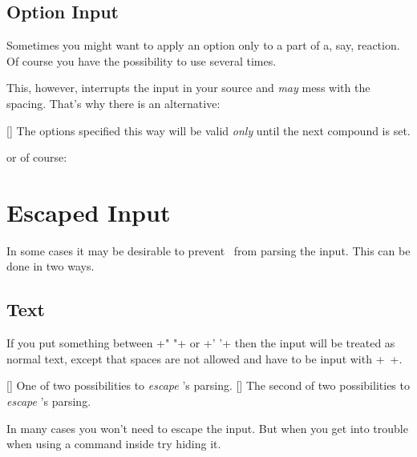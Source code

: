 \documentclass[load-preamble+]{cnltx-doc}
\begin{document}
\subsection{Option Input}
Sometimes you might want to apply an option only to a part of a, say,
reaction.  Of course you have the possibility to use  several times.
\begin{example}
  \textcolor{red}{} \par
\end{example}
This, however, interrupts the input in your source and \emph{may} mess with
the spacing. That's why there is an alternative:
\begin{commands}
  []
    The options specified this way will be valid \emph{only} until the next
    compound is set.
\end{commands}
\begin{example}
  \textcolor{red}{} \par
   \par
  or of course:\par
  \par\bigskip
   \par
\end{example}

\section{Escaped Input}
In some cases it may be desirable to prevent \chemformula\ from parsing the
input.  This can be done in two ways.

\subsection{Text}\label{ssec:text}
If you put something between \verbcode+" "+ or \verbcode+' '+ then the input
will be treated as normal text, except that spaces are not allowed and have to
be input with \verbcode+~+.
\begin{commands}
  []
    One of two possibilities to \emph{escape} \chemformula's parsing.
  []
    The second of two possibilities to \emph{escape} \chemformula's parsing.
\end{commands}
\begin{example}[add-sourcecode-options={literate=}]
   \par
   \par
\end{example}
In many cases you won't need to escape the input.  But when you get into
trouble when using a command inside  try hiding it.
\end{document}

